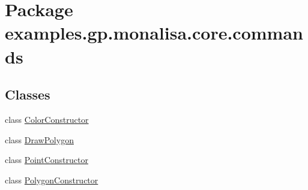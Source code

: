 \hypertarget{namespaceexamples_1_1gp_1_1monalisa_1_1core_1_1commands}{\section{Package examples.\-gp.\-monalisa.\-core.\-commands}
\label{namespaceexamples_1_1gp_1_1monalisa_1_1core_1_1commands}
}
\subsection*{Classes}
\begin{DoxyCompactItemize}
\item 
class \hyperlink{classexamples_1_1gp_1_1monalisa_1_1core_1_1commands_1_1_color_constructor}{Color\-Constructor}
\item 
class \hyperlink{classexamples_1_1gp_1_1monalisa_1_1core_1_1commands_1_1_draw_polygon}{Draw\-Polygon}
\item 
class \hyperlink{classexamples_1_1gp_1_1monalisa_1_1core_1_1commands_1_1_point_constructor}{Point\-Constructor}
\item 
class \hyperlink{classexamples_1_1gp_1_1monalisa_1_1core_1_1commands_1_1_polygon_constructor}{Polygon\-Constructor}
\end{DoxyCompactItemize}
